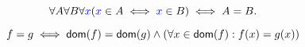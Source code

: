 \begin{frame}{}
  \begin{definition}
    \[
      \forall A \forall B \forall \textcolor{blue}{x} (\textcolor{blue}{x} \in A \iff \textcolor{blue}{x} \in B) \iff A = B.
    \]
  \end{definition}


  \pause
  \vspace{0.80cm}
  \begin{definition}[函数的外延性原则]
    \[
      f = g \iff \textsf{dom}(f) = \textsf{dom}(g) \land (\forall x \in \textsf{dom}(f): f(x) = g(x))
    \]
  \end{definition}
\end{frame}

